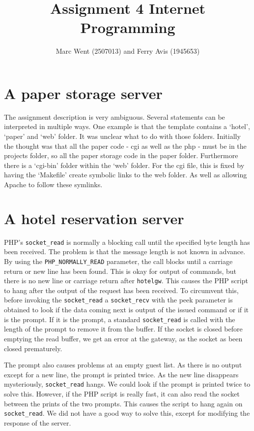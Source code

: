 \documentclass[11pt]{article}
\title{Assignment 4 Internet Programming}
\author{Marc Went (2507013) and Ferry Avis (1945653)}
\begin{document}
\maketitle
\section{A paper storage server}

The assignment description is very ambiguous. Several statements can be interpreted in multiple ways. One example is that the template contains a `hotel', `paper' and `web' folder. It was unclear what to do with those folders. Initially the thought was that all the paper code - cgi as well as the php - must be in the projects folder, so all the paper storage code in the paper folder. Furthermore there is a `cgi-bin' folder within the `web' folder. For the cgi file, this is fixed by having the `Makefile' create symbolic links to the web folder. As well as allowing Apache to follow these symlinks. 

\section{A hotel reservation server}

PHP's \texttt{socket\_read} is normally a blocking call until the specified byte length has been received. The problem is that the message length is not known in advance. By using the \texttt{PHP\_NORMALLY\_READ} parameter, the call blocks until a carriage return or new line has been found. This is okay for output of commands, but there is no new line or carriage return after \texttt{hotelgw}. This causes the PHP script to hang after the output of the request has been received. To circumvent this, before invoking the \texttt{socket\_read} a \texttt{socket\_recv} with the peek parameter is obtained to look if the data coming next is output of the issued command or if it is the prompt. If it is the prompt, a standard \texttt{socket\_read} is called with the length of the prompt to remove it from the buffer. If the socket is closed before emptying the read buffer, we get an error at the gateway, as the socket as been closed prematurely.

The prompt also causes problems at an empty guest list. As there is no output except for a new line, the prompt is printed twice. As the new line disappears mysteriously, \texttt{socket\_read} hangs. We could look if the prompt is printed twice to solve this. However, if the PHP script is really fast, it can also read the socket between the prints of the two prompts. This causes the script to hang again on \texttt{socket\_read}. We did not have a good way to solve this, except for modifying the response of the server.
\end{document}
